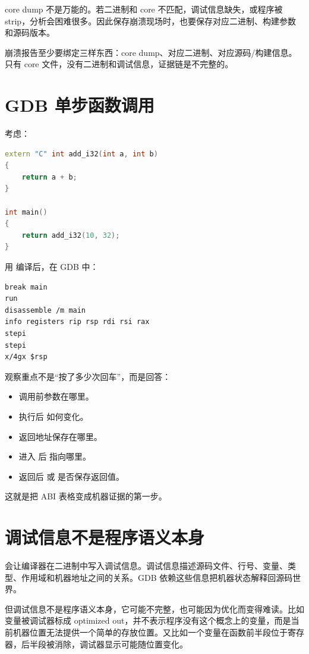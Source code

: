 core dump 不是万能的。若二进制和 core 不匹配，调试信息缺失，或程序被 strip，分析会困难很多。因此保存崩溃现场时，也要保存对应二进制、构建参数和源码版本。

\begin{keyidea}
崩溃报告至少要绑定三样东西：core dump、对应二进制、对应源码/构建信息。只有 core 文件，没有二进制和调试信息，证据链是不完整的。
\end{keyidea}

\section{GDB 单步函数调用}

考虑：

\begin{lstlisting}[language=C++]
extern "C" int add_i32(int a, int b)
{
    return a + b;
}

int main()
{
    return add_i32(10, 32);
}
\end{lstlisting}

用  编译后，在 GDB 中：

\begin{lstlisting}
break main
run
disassemble /m main
info registers rip rsp rdi rsi rax
stepi
stepi
x/4gx $rsp
\end{lstlisting}

观察重点不是“按了多少次回车”，而是回答：

\begin{itemize}
  \item 调用前参数在哪里。
  \item {} 执行后  如何变化。
  \item 返回地址保存在哪里。
  \item 进入  后  指向哪里。
  \item 返回后  或  是否保存返回值。
\end{itemize}

这就是把 ABI 表格变成机器证据的第一步。

\section{调试信息不是程序语义本身}

 会让编译器在二进制中写入调试信息。调试信息描述源码文件、行号、变量、类型、作用域和机器地址之间的关系。GDB 依赖这些信息把机器状态解释回源码世界。

但调试信息不是程序语义本身，它可能不完整，也可能因为优化而变得难读。比如变量被调试器标成 optimized out，并不表示程序没有这个概念上的变量，而是当前机器位置无法提供一个简单的存放位置。又比如一个变量在函数前半段位于寄存器，后半段被消除，调试器显示可能随位置变化。

